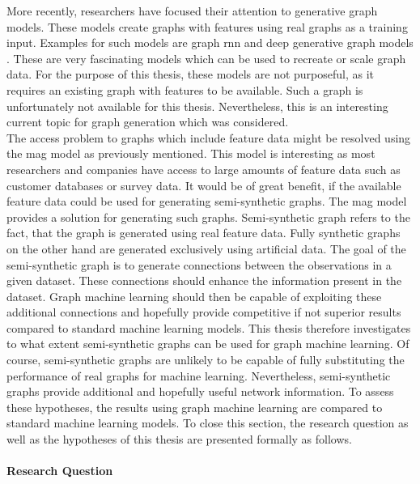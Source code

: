	\noindent More recently, researchers have focused their attention to
	generative graph models. These models create graphs with features using
	real graphs as a training input. Examples for such models are graph
	\ac{rnn} \citep{you2018graphrnn} and deep generative graph
	models \citep{li2018learning}. These are very fascinating models which can
	be used to recreate or scale graph data. For the purpose of this thesis,
	these models are not purposeful, as it requires an existing graph with
	features to be available. Such a graph is unfortunately not available for
	this thesis. Nevertheless, this is an interesting current topic for graph 
	generation which was considered. \\ 

	\noindent The access problem to graphs which include feature data might be 
	resolved using the \ac{mag} model as previously mentioned. This model is 
	interesting as most researchers and companies have access to large amounts 
	of feature data such as customer databases or survey data. It would be of
	great benefit, if the available feature data could be used for generating
	semi-synthetic graphs. The \acs{mag} model provides a solution for
	generating such graphs. Semi-synthetic graph refers to the fact, that the 
	graph is generated using real feature data. Fully synthetic graphs on the 
	other hand are generated exclusively using artificial data. The goal of the
	semi-synthetic graph is to generate connections between the observations in 
	a given dataset. These connections should enhance the information present
	in the dataset. Graph machine learning should then be capable of exploiting
	these additional connections and hopefully provide competitive if not
	superior results compared to standard machine learning models. This thesis 
	therefore investigates to what extent semi-synthetic graphs can be used for 
	graph machine learning. Of course, semi-synthetic graphs are unlikely to be
	capable of fully substituting the performance of real graphs for machine 
	learning. Nevertheless, semi-synthetic graphs provide additional and 
	hopefully useful network information. To assess these hypotheses, the 
	results using graph machine learning are compared to standard machine 
	learning models. To close this section, the research question as well as the 
	hypotheses of this thesis are presented formally as follows. 

	\paragraph{Research Question}\mbox{}

